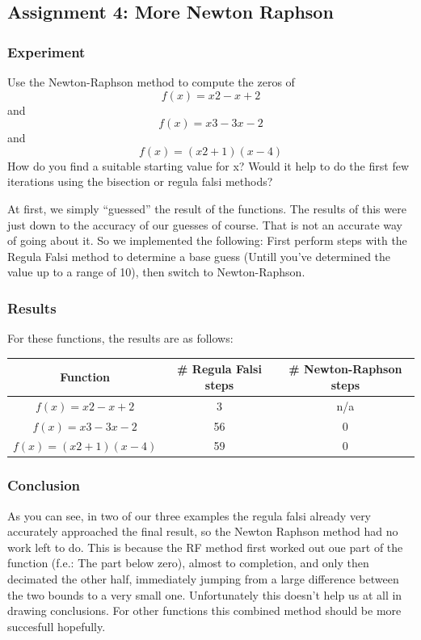 \documentclass[a4paper,10pt]{article}
\begin{document}
  \subsection{Assignment 4: More Newton Raphson}

  \subsubsection{Experiment}

    Use the Newton-Raphson method to compute the zeros of
                                              $$f(x) = x2 - x + 2$$
    and
                                            $$f(x) = x3 - 3x - 2$$
    and
                                          $$f(x) = (x2 + 1)(x - 4)$$
    How do you find a suitable starting value for x? Would it help to do the first few iterations using the
    bisection or regula falsi methods?


    At first, we simply ``guessed'' the result of the functions. The results of this were just down to the accuracy of our guesses of course. That is not an accurate way of going about it. So we implemented the following: First perform steps with the Regula Falsi method to determine a base guess (Untill you've determined the value up to a range of 10), then switch to Newton-Raphson.
  
  \subsubsection{Results}
  For these functions, the results are as follows:

  \begin{tabular}{|c|c|c|}
    \hline
    Function & \# Regula Falsi steps & \# Newton-Raphson steps\\
    \hline
    $f(x) = x2 - x + 2$ & 3 & n/a\\
    $f(x) = x3 - 3x - 2$ & 56 & 0\\
    $f(x) = (x2 + 1)(x - 4)$ & 59 & 0\\
    \hline
  \end{tabular}

  \subsubsection{Conclusion}

  As you can see, in two of our three examples the regula falsi already very accurately approached the final result, so the Newton Raphson method had no work left to do. This is because the RF method first worked out oue part of the function (f.e.: The part below zero), almost to completion, and only then decimated the other half, immediately jumping from a large difference between the two bounds to a very small one. Unfortunately this doesn't help us at all in drawing conclusions. For other functions this combined method should be more succesfull hopefully.
  
\end{document}
